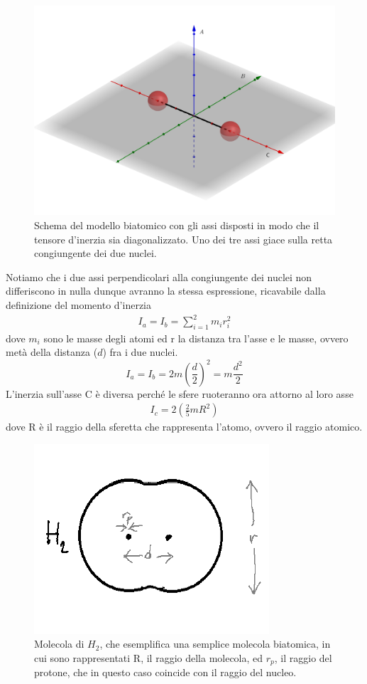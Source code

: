 \documentclass[
10pt, %
a4paper, %
oneside, %
headinclude,footinclude, %
BCOR5mm, %
]{scrartcl}
\begin{document}
\begin{figure}[h!]
	\centering
	\includegraphics[width=0.6\linewidth]{../images/modello_biatomico1}
	\caption{Schema del modello biatomico con gli assi disposti in modo che il tensore d'inerzia sia diagonalizzato. Uno dei tre assi giace sulla retta congiungente dei due nuclei.}
	\label{fig:modellobiatomico1}
\end{figure}
\FloatBarrier
Notiamo che i due assi perpendicolari alla congiungente dei nuclei non differiscono in nulla dunque avranno la stessa espressione, ricavabile dalla definizione del momento d'inerzia
\begin{align*} 
	I_a=I_b=\sum_{i=1}^{2}m_ir_i^2
\end{align*} 
dove \(m_i\) sono le masse degli atomi ed r la distanza tra l'asse e le masse, ovvero metà della distanza (\(d\)) fra i due nuclei. 
\[I_a=I_b=2 m \left(\frac{d}{2}\right)^2 = m\frac{d^2}{2}\]
L'inerzia sull'asse C è diversa perché le sfere ruoteranno ora attorno al loro asse
\begin{align*} 
	I_c = 2 \left(\frac{2}{5}m R^2 \right)
\end{align*} 
dove R è il raggio della sferetta che rappresenta l'atomo, ovvero il raggio atomico.
\begin{figure}[h!]
	\centering
	\includegraphics[width=0.4\linewidth]{../images/molecolaH2}
	\caption{Molecola di $H_2$, che esemplifica una semplice molecola biatomica, in cui sono rappresentati R, il raggio della molecola, ed $r_p$, il raggio del protone, che in questo caso coincide con il raggio del nucleo.}
	\label{fig:molecolah2}
\end{figure}
\end{document}
